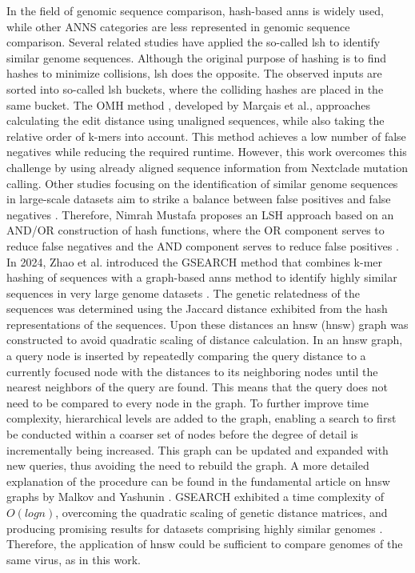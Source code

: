 In the field of genomic sequence comparison, hash-based \acrshort{anns} is widely used, while other ANNS categories are less represented in genomic sequence comparison. Several related studies have applied the so-called \acrfull{lsh} to identify similar genome sequences. Although the original purpose of hashing is to find hashes to minimize collisions, \acrshort{lsh} does the opposite. The observed inputs are sorted into so-called \acrshort{lsh} buckets, where the colliding hashes are placed in the same bucket. The OMH method \cite{Mar2}, developed by Marçais et al., approaches calculating the edit distance using unaligned sequences, while also taking the relative order of k-mers into account. This method achieves a low number of false negatives while reducing the required runtime. However, this work overcomes this challenge by using already aligned sequence information from Nextclade mutation calling. Other studies focusing on the identification of similar genome sequences in large-scale datasets aim to strike a balance between false positives and false negatives \cite{Mus1, Wan2}. Therefore, Nimrah Mustafa proposes an LSH approach based on an AND/OR construction of hash functions, where the OR component serves to reduce false negatives and the AND component serves to reduce false positives \cite{Mus1}. In 2024, Zhao et al. introduced the GSEARCH method that combines k-mer hashing of sequences with a graph-based \acrshort{anns} method to identify highly similar sequences in very large genome datasets \cite{Zha2}.
The genetic relatedness of the sequences was determined using the Jaccard distance exhibited from the hash representations of the sequences. Upon these distances an \acrshort{hnsw} (\acrlong{hnsw}) graph was constructed to avoid quadratic scaling of distance calculation. In an \acrshort{hnsw} graph, a query node is inserted by repeatedly comparing the query distance to a currently focused node with the distances to its neighboring nodes until the nearest neighbors of the query are found. This means that the query does not need to be compared to every node in the graph. To further improve time complexity, hierarchical levels are added to the graph, enabling a search to first be conducted within a coarser set of nodes before the degree of detail is incrementally being increased. This graph can be updated and expanded with new queries, thus avoiding the need to rebuild the graph. A more detailed explanation of the procedure can be found in the fundamental article on \acrshort{hnsw} graphs by Malkov and Yashunin \cite{Mal1}. GSEARCH exhibited a time complexity of $O(log n)$, overcoming the quadratic scaling of genetic distance matrices, and producing promising results for datasets comprising highly similar genomes \cite{Zha2}. Therefore, the application of \acrshort{hnsw} could be sufficient to compare genomes of the same virus, as in this work.

